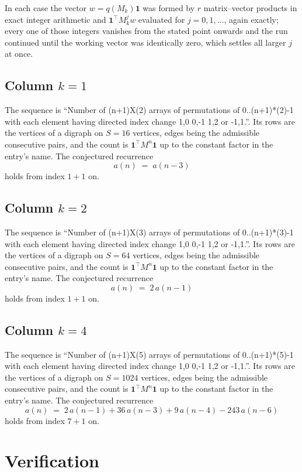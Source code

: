 \documentclass[11pt,a4paper]{article}
\theoremstyle{plain}
\theoremstyle{definition}
\begin{document}
In each case the vector $w=q(M_k)\mathbf{1}$ was formed by $r$ matrix--vector products in
exact integer arithmetic and $\mathbf{1}^{\!\top}M_k^{j}w$ evaluated for $j=0,1,\dots$,
again exactly; every one of those integers vanishes from the stated point onwards and the run
continued until the working vector was identically zero, which settles all larger $j$ at once.

\subsection*{Column $k$$=1$}
The sequence is ``Number of (n+1)X(2) arrays of permutations of 0..(n+1)*(2)-1 with each element having directed index change 1,0 0,-1 1,2 or -1,1.''. Its rows are the vertices of a digraph on
$S=16$ vertices, edges being the admissible consecutive pairs, and the count is
$\mathbf{1}^{\!\top}M^{n}\mathbf{1}$ up to the constant factor in the entry's name.
The conjectured recurrence
\[
a(n)\;=\;a(n-3)
\]
holds from index $1+1$ on.

\subsection*{Column $k$$=2$}
The sequence is ``Number of (n+1)X(3) arrays of permutations of 0..(n+1)*(3)-1 with each element having directed index change 1,0 0,-1 1,2 or -1,1.''. Its rows are the vertices of a digraph on
$S=64$ vertices, edges being the admissible consecutive pairs, and the count is
$\mathbf{1}^{\!\top}M^{n}\mathbf{1}$ up to the constant factor in the entry's name.
The conjectured recurrence
\[
a(n)\;=\;2\,a(n-1)
\]
holds from index $1+1$ on.

\subsection*{Column $k$$=4$}
The sequence is ``Number of (n+1)X(5) arrays of permutations of 0..(n+1)*(5)-1 with each element having directed index change 1,0 0,-1 1,2 or -1,1.''. Its rows are the vertices of a digraph on
$S=1024$ vertices, edges being the admissible consecutive pairs, and the count is
$\mathbf{1}^{\!\top}M^{n}\mathbf{1}$ up to the constant factor in the entry's name.
The conjectured recurrence
\[
a(n)\;=\;2\,a(n-1) + 36\,a(n-3) + 9\,a(n-4) - 243\,a(n-6)
\]
holds from index $7+1$ on.

\section{Verification}
\end{document}
